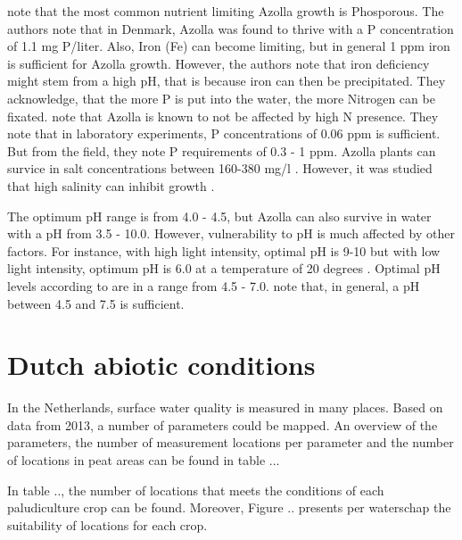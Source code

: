 \documentclass[a4paper,12pt]{scrbook}
\begin{document}
\citet{lumpkin1980azolla} note that the most common nutrient limiting Azolla growth is Phosporous. The authors note that in Denmark, Azolla was found to thrive with a P concentration of 1.1 mg P/liter. Also, Iron (Fe) can become limiting, but in general 1 ppm iron is  sufficient for Azolla growth. However, the authors note that iron deficiency might stem from a high pH, that is because iron can then be precipitated. They acknowledge, that the more P is put into the water, the more Nitrogen can be fixated. \citet{sabetraftar2013review} note that Azolla is known to not be affected by high N presence. They note that in laboratory experiments, P concentrations of 0.06 ppm  is sufficient. But from the field, they note P requirements of 0.3 - 1 ppm. Azolla plants can survice in salt concentrations between 160-380 mg/l  \citep{lumpkin1980azolla}. However, it was studied that high salinity can inhibit growth \citep{sabetraftar2013review, lumpkin1980azolla}. 

The optimum pH range is from 4.0 - 4.5, but Azolla can also survive in water with a pH from 3.5 - 10.0. However, vulnerability to pH is much affected by other factors. For instance, with high light intensity, optimal pH is 9-10 but with low light intensity, optimum pH is 6.0 at a temperature of 20 degrees \citep{wagner1997azolla}. Optimal pH levels according to \citet{lumpkin1980azolla} are in a range from 4.5 - 7.0. \citet{sabetraftar2013review} note that, in general, a pH between 4.5 and 7.5 is sufficient.





\section{Dutch abiotic conditions}

In the Netherlands, surface water quality is measured in many places. Based on data from 2013, a number of parameters could be mapped. An overview of the parameters, the number of measurement locations per parameter and the number of locations in peat areas can be found in table ... 

In table .., the number of locations that meets the conditions of each paludiculture crop can be found. Moreover, Figure .. presents per waterschap the suitability of locations for each crop. 
\end{document}
